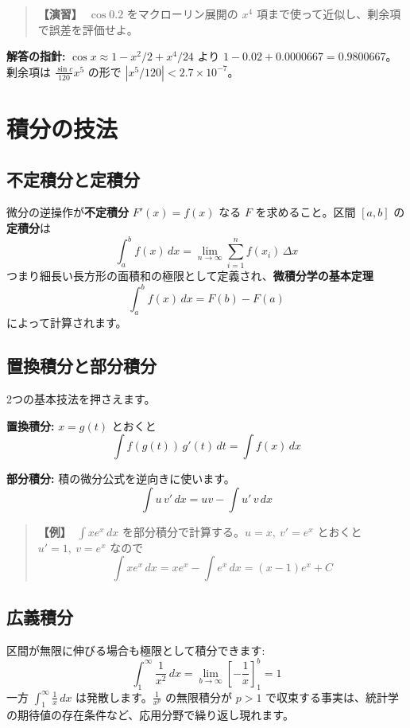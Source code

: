 \documentclass{article}
\begin{document}
\begin{quote}
\textbf{【演習】}\ \(\cos 0.2\) をマクローリン展開の \(x^4\) 項まで使って近似し、剰余項で誤差を評価せよ。
\end{quote}

\textbf{解答の指針:} \(\cos x \approx 1 - x^2/2 + x^4/24\) より \(1 - 0.02 + 0.0000667 = 0.9800667\)。剰余項は \(\frac{\sin c}{120} x^5\) の形で \(|x^5/120| < 2.7 \times 10^{-7}\)。

\section{積分の技法}

\subsection{不定積分と定積分}

微分の逆操作が\textbf{不定積分} \(F'(x) = f(x)\) なる \(F\) を求めること。区間 \([a, b]\) の\textbf{定積分}は
\[ \int_a^b f(x)\, dx = \lim_{n \to \infty} \sum_{i=1}^{n} f(x_i)\, \Delta x \]
つまり細長い長方形の面積和の極限として定義され、\textbf{微積分学の基本定理}
\[ \int_a^b f(x)\, dx = F(b) - F(a) \]
によって計算されます。

\subsection{置換積分と部分積分}

2つの基本技法を押さえます。

\textbf{置換積分:} \(x = g(t)\) とおくと
\[ \int f(g(t))\, g'(t)\, dt = \int f(x)\, dx \]

\textbf{部分積分:} 積の微分公式を逆向きに使います。
\[ \int u\, v'\, dx = uv - \int u'\, v\, dx \]

\begin{quote}
\textbf{【例】}\ \(\int x e^x\, dx\) を部分積分で計算する。\(u = x,\ v' = e^x\) とおくと \(u' = 1,\ v = e^x\) なので
\[ \int x e^x\, dx = x e^x - \int e^x\, dx = (x - 1) e^x + C \]
\end{quote}

\subsection{広義積分}

区間が無限に伸びる場合も極限として積分できます:
\[ \int_1^{\infty} \frac{1}{x^2}\, dx = \lim_{b \to \infty} \left[ -\frac{1}{x} \right]_1^b = 1 \]
一方 \(\int_1^\infty \frac{1}{x}\, dx\) は発散します。\(\frac{1}{x^p}\) の無限積分が \(p > 1\) で収束する事実は、統計学の期待値の存在条件など、応用分野で繰り返し現れます。
\end{document}

